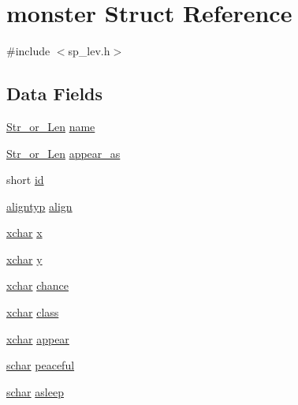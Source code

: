 \hypertarget{structmonster}{\section{monster Struct Reference}
\label{structmonster}
}


{\ttfamily \#include $<$sp\+\_\+lev.\+h$>$}

\subsection*{Data Fields}
\begin{DoxyCompactItemize}
\item 
\hyperlink{sp__lev_8h_ac575b18cce85a1027632cac53c2c42ac}{Str\+\_\+or\+\_\+\+Len} \hyperlink{structmonster_aaa15fa26f0d72ddcd172dd3309791e87}{name}
\item 
\hyperlink{sp__lev_8h_ac575b18cce85a1027632cac53c2c42ac}{Str\+\_\+or\+\_\+\+Len} \hyperlink{structmonster_a5aee88b4ae76f77c49e9909cb019cd13}{appear\+\_\+as}
\item 
short \hyperlink{structmonster_a0f93873707206ac7f13bc2463bc0ad3b}{id}
\item 
\hyperlink{align_8h_a3e17b7a656899892e425fc89481aa2ab}{aligntyp} \hyperlink{structmonster_a9572ac33b3cb42a51567421458c44ce6}{align}
\item 
\hyperlink{global_8h_a2043b7d01ce89f4ee2fa6c345a752d32}{xchar} \hyperlink{structmonster_a2af2a4a4778c20fadc588e1975548be1}{x}
\item 
\hyperlink{global_8h_a2043b7d01ce89f4ee2fa6c345a752d32}{xchar} \hyperlink{structmonster_ab070466d620bc4927de04afaaf9d362b}{y}
\item 
\hyperlink{global_8h_a2043b7d01ce89f4ee2fa6c345a752d32}{xchar} \hyperlink{structmonster_ae5fb6db682fc3fd0c092b366759e18f5}{chance}
\item 
\hyperlink{global_8h_a2043b7d01ce89f4ee2fa6c345a752d32}{xchar} \hyperlink{structmonster_a4b3f5c37c4152aa7007f9973c816912e}{class}
\item 
\hyperlink{global_8h_a2043b7d01ce89f4ee2fa6c345a752d32}{xchar} \hyperlink{structmonster_a464f427d9d531bc63c569d3033bf552f}{appear}
\item 
\hyperlink{config_8h_a0fd9ce9d735064461bebfe6037026093}{schar} \hyperlink{structmonster_aebb89be3760164c80425bf7d87795809}{peaceful}
\item 
\hyperlink{config_8h_a0fd9ce9d735064461bebfe6037026093}{schar} \hyperlink{structmonster_a8fd73840258e9cc6bb1f68e99b4a2fbd}{asleep}
\end{DoxyCompactItemize}


